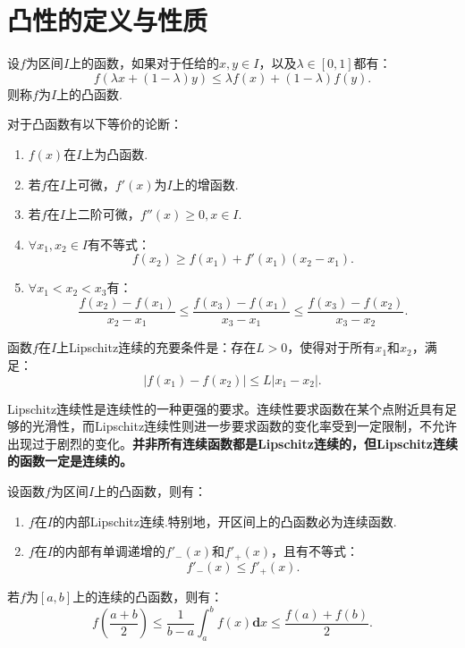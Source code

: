 \section{凸性的定义与性质}

\begin{definition}
	设$f$为区间$I$上的函数，如果对于任给的$x,y\in I$，以及$\lambda\in [0,1]$都有：
	\begin{equation}
		f\left(\lambda x+(1-\lambda)y\right) \leq \lambda f(x)+(1-\lambda)f(y).
	\end{equation}
	则称$f$为$I$上的凸函数.
\end{definition}

\begin{theorem}
	对于凸函数有以下等价的论断：
	\begin{enumerate}
		\item $f(x)$在$I$上为凸函数.
		\item 若$f$在$I$上可微，$f'(x)$为$I$上的增函数.
		\item 若$f$在$I$上二阶可微，$f''(x)\geq 0,x\in I.$
		\item $\forall x_1,x_2\in I$有不等式：
		\begin{equation}
			f(x_2)\geq f(x_1)+f'(x_1)(x_2-x_1).
		\end{equation}
		\item $\forall x_1<x_2<x_3$有：
		\begin{equation}
			\dfrac{f(x_2)-f(x_1)}{x_2-x_1}\leq\dfrac{f(x_3)-f(x_1)}{x_3-x_1}\leq\dfrac{f(x_3)-f(x_2)}{x_3-x_2}.
		\end{equation}
	\end{enumerate}
\end{theorem}

\begin{definition}[Lipschitz连续]
	函数$f$在$I$上Lipschitz连续的充要条件是：存在$L>0$，使得对于所有$x_1$和$x_2$，满足：
	\begin{equation}
		|f(x_1) - f(x_2)| \leq L|x_1 - x_2|.
	\end{equation}
\end{definition}

Lipschitz连续性是连续性的一种更强的要求。连续性要求函数在某个点附近具有足够的光滑性，而Lipschitz连续性则进一步要求函数的变化率受到一定限制，不允许出现过于剧烈的变化。\textbf{并非所有连续函数都是Lipschitz连续的，但Lipschitz连续的函数一定是连续的。}

\begin{proposition}
	设函数$f$为区间$I$上的凸函数，则有：
	\begin{enumerate}
		\item $f$在$I$的内部Lipschitz连续.特别地，开区间上的凸函数必为连续函数.
		\item $f$在$I$的内部有单调递增的$f'_-(x)$和$f'_+(x)$，且有不等式：
		\begin{equation}
			f'_-(x)\leq f'_+(x).
		\end{equation}
	\end{enumerate}
\end{proposition}


\begin{proposition}
	若$f$为$[a,b]$上的连续的凸函数，则有：
	\begin{equation}
		f(\dfrac{a+b}{2})\leq\dfrac{1}{b-a}\int_{a}^{b}f(x)\textbf{d}x\leq\dfrac{f(a)+f(b)}{2}.
	\end{equation}
	
\end{proposition}